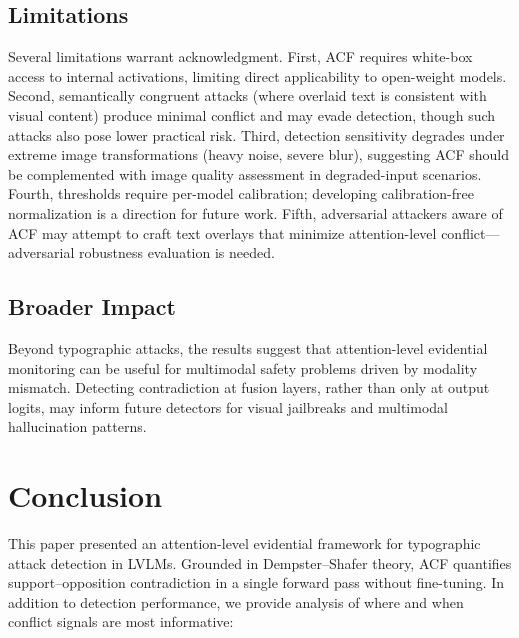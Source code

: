 \documentclass[preprint,12pt]{elsarticle}
\begin{document}
\subsection{Limitations}

Several limitations warrant acknowledgment. First, ACF requires white-box access to internal activations, limiting direct applicability to open-weight models. Second, semantically congruent attacks (where overlaid text is consistent with visual content) produce minimal conflict and may evade detection, though such attacks also pose lower practical risk. Third, detection sensitivity degrades under extreme image transformations (heavy noise, severe blur), suggesting ACF should be complemented with image quality assessment in degraded-input scenarios. Fourth, thresholds require per-model calibration; developing calibration-free normalization is a direction for future work. Fifth, adversarial attackers aware of ACF may attempt to craft text overlays that minimize attention-level conflict---adversarial robustness evaluation is needed.

\subsection{Broader Impact}

Beyond typographic attacks, the results suggest that attention-level evidential monitoring can be useful for multimodal safety problems driven by modality mismatch. Detecting contradiction at fusion layers, rather than only at output logits, may inform future detectors for visual jailbreaks and multimodal hallucination patterns.

\FloatBarrier
\section{Conclusion}

This paper presented an attention-level evidential framework for typographic attack detection in LVLMs. Grounded in Dempster--Shafer theory, ACF quantifies support--opposition contradiction in a single forward pass without fine-tuning. In addition to detection performance, we provide analysis of where and when conflict signals are most informative:
\end{document}
